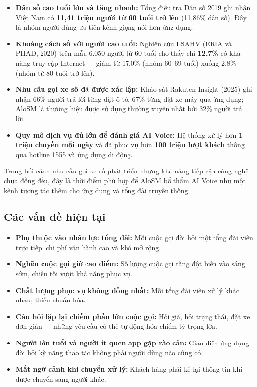 \documentclass[12pt,a4paper]{article}
\begin{document}
\begin{itemize}
  \item \textbf{Dân số cao tuổi lớn và tăng nhanh:} Tổng điều tra Dân số 2019 ghi nhận Việt Nam có \textbf{11,41 triệu người từ 60 tuổi trở lên} (11,86\% dân số). Đây là nhóm người dùng ưu tiên kênh giọng nói hơn ứng dụng.
  \item \textbf{Khoảng cách số với người cao tuổi:} Nghiên cứu LSAHV (ERIA và PHAD, 2020) trên mẫu 6.050 người từ 60 tuổi cho thấy chỉ \textbf{12,7\%} có khả năng truy cập Internet --- giảm từ 17,0\% (nhóm 60--69 tuổi) xuống 2,8\% (nhóm từ 80 tuổi trở lên).
  \item \textbf{Nhu cầu gọi xe số đã được xác lập:} Khảo sát Rakuten Insight (2025) ghi nhận 66\% người trả lời từng đặt ô tô, 67\% từng đặt xe máy qua ứng dụng; AloSM là thương hiệu được sử dụng thường xuyên nhất bởi 32\% người trả lời.
  \item \textbf{Quy mô dịch vụ đủ lớn để đánh giá AI Voice:} Hệ thống xử lý hơn \textbf{1 triệu chuyến mỗi ngày} và đã phục vụ hơn \textbf{100 triệu lượt khách} thông qua hotline 1555 và ứng dụng di động.
\end{itemize}

Trong bối cảnh nhu cầu gọi xe số phát triển nhưng khả năng tiếp cận công nghệ chưa đồng đều, đây là thời điểm phù hợp để AloSM bổ thẩm AI Voice như một kênh tương tác thêm cho ứng dụng và tổng đài truyền thống.

\subsection{Các vấn đề hiện tại}
\begin{itemize}
  \item \textbf{Phụ thuộc vào nhân lực tổng đài:} Mỗi cuộc gọi đòi hỏi một tổng đài viên trực tiếp; chi phí vận hành cao và khó mở rộng.
  \item \textbf{Nghẽn cuộc gọi giờ cao điểm:} Số lượng cuộc gọi tăng đột biến vào sáng sớm, chiều tối vượt khả năng phục vụ.
  \item \textbf{Chất lượng phục vụ không đồng nhất:} Mỗi tổng đài viên xử lý khác nhau; thiếu chuẩn hóa.
  \item \textbf{Câu hỏi lặp lại chiếm phần lớn cuộc gọi:} Hỏi giá, hỏi trạng thái, đặt xe đơn giản --- những yêu cầu có thể tự động hóa chiếm tỷ trọng lớn.
  \item \textbf{Người lớn tuổi và người ít quen app gặp rào cản:} Giao diện ứng dụng đòi hỏi kỹ năng thao tác không phải người dùng nào cũng có.
  \item \textbf{Mất ngữ cảnh khi chuyển xử lý:} Khách hàng phải kể lại thông tin khi được chuyển sang người khác.
\end{itemize}
\end{document}
